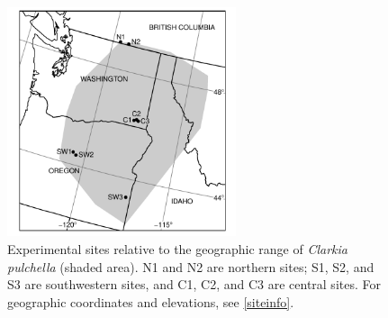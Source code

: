 \documentclass{article}
\begin{document}
\clearpage


\begin{figure}[p]
\centering
\includegraphics[width = 0.6\textwidth]{figs/map}
\caption[Experimental sites relative to the geographic range of \textit{Clarkia pulchella}]{Experimental sites relative to the geographic range of \textit{Clarkia pulchella} (shaded area). N1 and N2 are northern sites; S1, S2, and S3 are southwestern sites, and C1, C2, and C3 are central sites. For geographic coordinates and elevations, see \autoref{siteinfo}.}
\label{map}
\end{figure}


\clearpage
\end{document}
